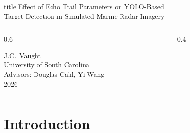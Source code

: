 \documentclass[aspectratio=169, 10pt]{beamer}
\begin{document}
{
\begin{frame}[plain]
\vspace{1.5cm}
\begin{beamercolorbox}[wd=\paperwidth, ht=3em, dp=1em, leftskip=1cm]{title}
  Effect of Echo Trail Parameters on YOLO-Based\\
  Target Detection in Simulated Marine Radar Imagery
\end{beamercolorbox}
\vspace{0.8cm}
\begin{columns}[T]
\begin{column}{0.6\textwidth}
  \hspace{1cm}
  \begin{minipage}{0.9\textwidth}
    {J.C.\ Vaught}\\[0.3em]
    {University of South Carolina\\
    Advisors: Douglas Cahl, Yi Wang}\\[0.5em]
    {2026}
  \end{minipage}
\end{column}
\begin{column}{0.4\textwidth}
\end{column}
\end{columns}
\end{frame}
}

\section{Introduction}
\end{document}
